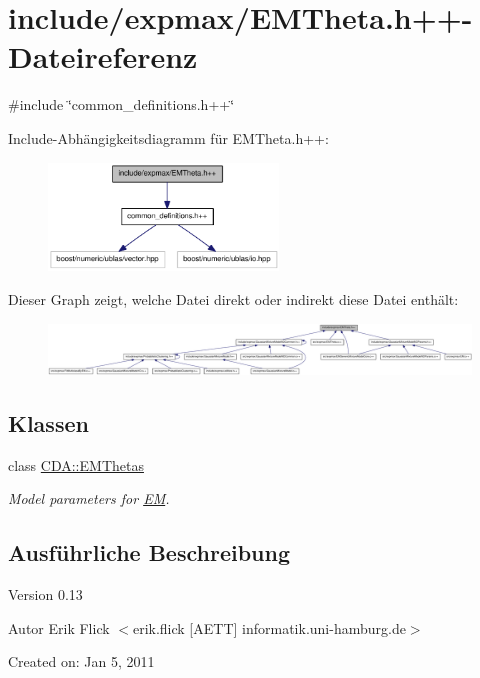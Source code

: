 \hypertarget{EMTheta_8h_09_09}{
\section{include/expmax/EMTheta.h++-\/Dateireferenz}
\label{EMTheta_8h_09_09}
}
{\ttfamily \#include \char`\"{}common\_\-definitions.h++\char`\"{}}\par
Include-\/Abhängigkeitsdiagramm für EMTheta.h++:\nopagebreak
\begin{figure}[H]
\begin{center}
\leavevmode
\includegraphics[width=173pt]{EMTheta_8h_09_09__incl}
\end{center}
\end{figure}
Dieser Graph zeigt, welche Datei direkt oder indirekt diese Datei enthält:\nopagebreak
\begin{figure}[H]
\begin{center}
\leavevmode
\includegraphics[width=420pt]{EMTheta_8h_09_09__dep__incl}
\end{center}
\end{figure}
\subsection*{Klassen}
\begin{DoxyCompactItemize}
\item 
class \hyperlink{classCDA_1_1EMThetas}{CDA::EMThetas}
\begin{DoxyCompactList}\small\item\em Model parameters for \hyperlink{classCDA_1_1EM}{EM}. \item\end{DoxyCompactList}\end{DoxyCompactItemize}


\subsection{Ausführliche Beschreibung}
\begin{DoxyVersion}{Version}
0.13 
\end{DoxyVersion}
\begin{DoxyAuthor}{Autor}
Erik Flick $<$erik.flick \mbox{[}AETT\mbox{]} informatik.uni-\/hamburg.de$>$
\end{DoxyAuthor}
Created on: Jan 5, 2011 